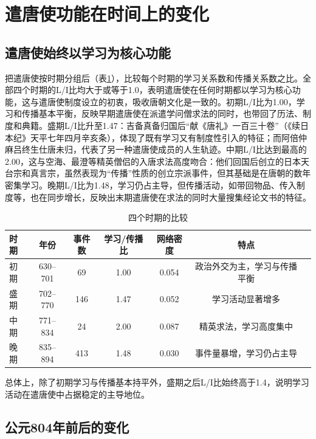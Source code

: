 \documentclass[12pt,a4paper]{article}
\begin{document}
\section{遣唐使功能在时间上的变化}

\subsection{遣唐使始终以学习为核心功能}

把遣唐使按时期分组后（表\ref{tab:temporal}），比较每个时期的学习关系数和传播关系数之比。全部四个时期的L/I比均大于或等于1.0，表明遣唐使在任何时期都以学习为核心功能，这与遣唐使制度设立的初衷，吸收唐朝文化是一致的。初期L/I比为1.00，学习和传播基本平衡，反映早期遣唐使在派遣学问僧求法的同时，也带回了历法、制度和典籍。盛期L/I比升至1.47：吉备真备归国后“献《唐礼》一百三十卷”（《续日本纪》天平七年四月辛亥条），体现了既有学习又有制度性引入的特征；而阿倍仲麻吕终生仕唐未归，代表了另一种遣唐使成员的人生轨迹。中期L/I比达到最高的2.00，这与空海、最澄等精英僧侣的入唐求法高度吻合：他们回国后创立的日本天台宗和真言宗，虽然表现为“传播”性质的创立宗派事件，但其基础是在唐朝的数年密集学习。晚期L/I比为1.48，学习仍占主导，但传播活动，如带回物品、传入制度等，也在同步增长，反映出末期遣唐使在求法的同时大量搜集经论文书的特征。

\begin{table}[H]
\centering
\caption{四个时期的比较}
\label{tab:temporal}
\begin{tabular}{lcccccp{4cm}}
\toprule
\textbf{时期} & \textbf{年份} & \textbf{事件数} & \textbf{学习/传播比} & \textbf{网络密度} & \textbf{特点} \\
\midrule
初期 & 630--701 & 69 & 1.00 & 0.054 & 政治外交为主，学习与传播平衡 \\
盛期 & 702--770 & 146 & 1.47 & 0.052 & 学习活动显著增多 \\
中期 & 771--834 & 24 & 2.00 & 0.087 & 精英求法，学习高度集中 \\
晚期 & 835--894 & 413 & 1.48 & 0.030 & 事件量暴增，学习仍占主导 \\
\bottomrule
\end{tabular}
\end{table}

总体上，除了初期学习与传播基本持平外，盛期之后L/I比始终高于1.4，说明学习活动在遣唐使中占据稳定的主导地位。

\subsection{公元804年前后的变化}
\end{document}
